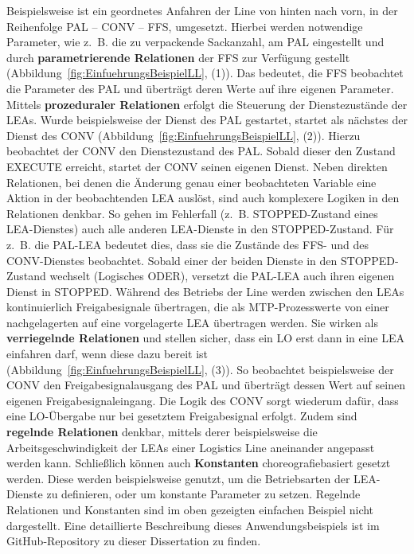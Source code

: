 Beispielsweise ist ein geordnetes Anfahren der Line von hinten nach vorn, in der Reihenfolge PAL -- CONV -- FFS, umgesetzt. Hierbei werden notwendige Parameter, wie z.~B. die zu verpackende Sackanzahl, am PAL eingestellt und durch \textbf{parametrierende Relationen} der FFS zur Verfügung gestellt (Abbildung~\ref{fig:EinfuehrungsBeispielLL}, (1)). Das bedeutet, die FFS beobachtet die Parameter des PAL und überträgt deren Werte auf ihre eigenen Parameter. Mittels \textbf{prozeduraler Relationen} erfolgt die Steuerung der Dienstezustände der LEAs. Wurde beispielsweise der Dienst des PAL gestartet, startet als nächstes der Dienst des CONV (Abbildung~\ref{fig:EinfuehrungsBeispielLL}, (2)). Hierzu beobachtet der CONV den Dienstezustand des PAL. Sobald dieser den Zustand EXECUTE erreicht, startet der CONV seinen eigenen Dienst. Neben direkten Relationen, bei denen die Änderung genau einer beobachteten Variable eine Aktion in der beobachtenden LEA auslöst, sind auch komplexere Logiken in den Relationen denkbar. So gehen im Fehlerfall (z.~B. STOPPED-Zustand eines LEA-Dienstes) auch alle anderen LEA-Dienste in den STOPPED-Zustand. Für z.~B. die PAL-LEA bedeutet dies, dass sie die Zustände des FFS- und des CONV-Dienstes beobachtet. Sobald einer der beiden Dienste in den STOPPED-Zustand wechselt (Logisches ODER), versetzt die PAL-LEA auch ihren eigenen Dienst in STOPPED. Während des Betriebs der Line werden zwischen den LEAs kontinuierlich Freigabesignale übertragen, die als MTP-Prozesswerte von einer nachgelagerten auf eine vorgelagerte LEA übertragen werden. Sie wirken als \textbf{verriegelnde Relationen} und stellen sicher, dass ein LO erst dann in eine LEA einfahren darf, wenn diese dazu bereit ist (Abbildung~\ref{fig:EinfuehrungsBeispielLL}, (3)). So beobachtet beispielsweise der CONV den Freigabesignalausgang des PAL und überträgt dessen Wert auf seinen eigenen Freigabesignaleingang. Die Logik des CONV sorgt wiederum dafür, dass eine LO-Übergabe nur bei gesetztem Freigabesignal erfolgt. Zudem sind \textbf{regelnde Relationen} denkbar, mittels derer beispielsweise die Arbeitsgeschwindigkeit der LEAs einer Logistics Line aneinander angepasst werden kann. Schließlich können auch \textbf{Konstanten} choreografiebasiert gesetzt werden. Diese werden beispielsweise genutzt, um die Betriebsarten der LEA-Dienste zu definieren, oder um konstante Parameter zu setzen. Regelnde Relationen und Konstanten sind im oben gezeigten einfachen Beispiel nicht dargestellt. Eine detaillierte Beschreibung dieses Anwendungsbeispiels ist im GitHub-Repository zu dieser Dissertation \cite{Blumenstein.Github} zu finden. 

